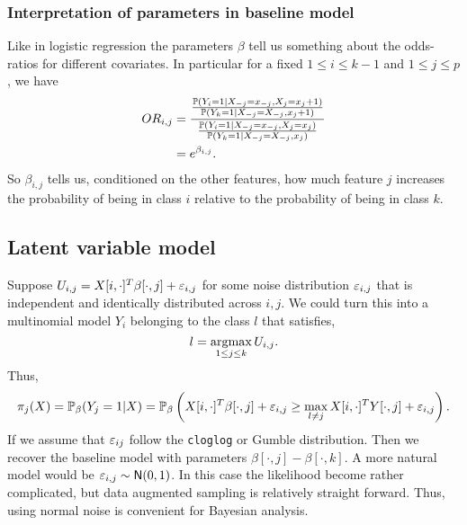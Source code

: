 \subsubsection{Interpretation of parameters in baseline model}
Like in logistic regression the parameters $\beta$ tell us something about the odds-ratios for different covariates. In particular for a fixed $1 \le i \le k-1 $ and $1 \le j\le p$, we have 
\begin{align*}
    OR_{i,j} &=\frac{\frac{{\mathbb{P}}(Y_{i}=1|X_{-j}=x_{-j}, X_j = x_j+1)}{{\mathbb{P}}(Y_{k}=1|X_{-j}=X_{-j}, x_j+1)}}{\frac{{\mathbb{P}}(Y_{i}=1|X_{-j}=x_{-j}, X_j = x_j)}{{\mathbb{P}}(Y_{k}=1|X_{-j}=X_{-j}, x_j)}}\\
    &=e^{\beta_{i,j}}.
\end{align*}
So $\beta_{i,j}$ tells us, conditioned on the other features, how much feature $j$ increases the probability of being in class $i$ relative to the probability of being in class $k$.
\subsection{Latent variable model}
Suppose $U_{i,j} = X[i,\cdot]^T\beta[\cdot, j]+\varepsilon_{i,j}$ for some noise distribution $\varepsilon_{i,j}$ that is independent and identically distributed across $i,j$. We could turn this into a multinomial model $Y_i$ belonging to the class $l$ that satisfies,
\[l = \operatorname*{argmax}_{1 \le j \le k} U_{i,j}. \]
Thus, 
\[\pi_j(X) = {\mathbb{P}}_\beta(Y_j = 1|X) = {\mathbb{P}}_\beta\left(X[i,\cdot]^T\beta[\cdot,j] + \varepsilon_{i,j} \ge \max_{l \neq j}X[i,\cdot]^TY[\cdot,j]+\varepsilon_{i,j}\right). \]
If we assume that $\varepsilon_{ij}$ follow the \texttt{cloglog} or Gumble distribution. Then we recover the baseline model with parameters $\beta[\cdot,j] -\beta[\cdot,k]$. A more natural model would be $\varepsilon_{i,j} \sim \mathsf{N}(0,1)$. In this case the likelihood become rather complicated, but data augmented sampling is relatively straight forward. Thus, using normal noise is convenient for Bayesian analysis.


